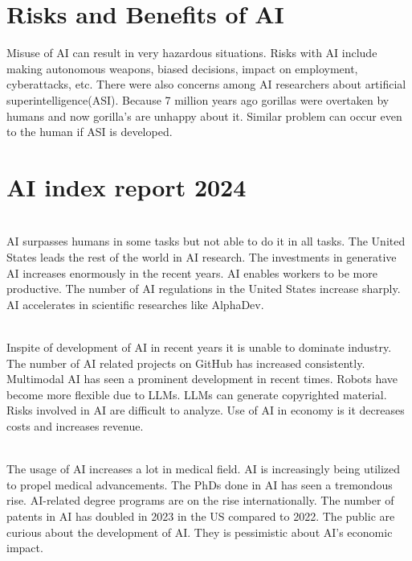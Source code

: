 \documentclass{article}
\begin{document}
\section{Risks and Benefits of AI}
Misuse of AI can result in very hazardous situations. Risks with AI include making autonomous weapons, biased decisions, impact on employment, cyberattacks, etc. There were also concerns among AI researchers about artificial superintelligence(ASI). Because 7 million years ago gorillas were overtaken by humans and now gorilla's are unhappy about it. Similar problem can occur even to the human if ASI is developed.
\section{AI index report 2024}
\begin{paragraph}
\\
AI surpasses humans in some tasks but not able to do it in all tasks. The United States leads the rest of the world in AI research. The investments in generative AI increases enormously in the recent years. AI enables workers to be more productive. The number of AI regulations in the United States increase sharply. AI accelerates in scientific researches like AlphaDev.
\end{paragraph}
\begin{paragraph}
\\
Inspite of development of AI in recent years it is unable to dominate industry. The number of AI related projects on GitHub has increased consistently. Multimodal AI has seen a prominent development in recent times. Robots have become more flexible due to LLMs. LLMs can generate copyrighted material. Risks involved in AI are difficult to analyze. Use of AI in economy is it decreases costs and increases revenue.
\end{paragraph}
\begin{paragraph}
\\
The usage of AI increases a lot in medical field. AI is increasingly being utilized to propel medical advancements. The PhDs done in AI has seen a tremondous rise. AI-related degree programs are on the rise internationally. The number of patents in AI has doubled in 2023 in the US compared to 2022. The public are curious about the development of AI. They is pessimistic about AI’s economic impact.
\end{paragraph}
\end{document}
